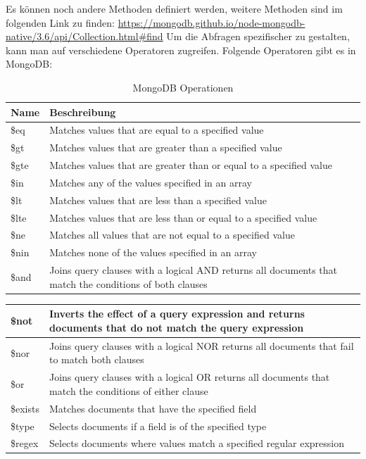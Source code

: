 \cite{mongodb_query_methods}
\newline
Es können noch andere Methoden definiert werden, weitere Methoden sind im folgenden Link zu finden:
\newline
\url{https://mongodb.github.io/node-mongodb-native/3.6/api/Collection.html#find}
\newline
Um die Abfragen spezifischer zu gestalten, kann man auf verschiedene Operatoren zugreifen. Folgende Operatoren gibt es in MongoDB:
\begin{table}[h]
\caption{MongoDB Operationen}
\label{demo-table}
    \begin{tabular}{ | m{1.5cm} | m{13cm} | } 
        \hline
        Name & Beschreibung \\ [0.5ex] 
        \hline\hline
        \$eq & Matches values that are equal to a specified value \\
        \hline
        \$gt & Matches values that are greater than a specified value \\
        \hline
        \$gte & Matches values that are greater than or equal to a specified value \\
        \hline
        \$in & Matches any of the values specified in an array \\
        \hline
        \$lt & Matches values that are less than a specified value \\
        \hline
        \$lte & Matches values that are less than or equal to a specified value \\
        \hline
        \$ne & Matches all values that are not equal to a specified value \\
        \hline
        \$nin & Matches none of the values specified in an array \\
        \hline
        \$and & Joins query clauses with a logical AND returns all documents that match the conditions of both clauses \\
    \end{tabular}
\end{table}
\begin{center}
    \begin{tabular}{ | m{1.5cm} | m{13cm} | }
        \$not & Inverts the effect of a query expression and returns documents that do not match the query expression \\
        \hline
        \$nor & Joins query clauses with a logical NOR returns all documents that fail to match both clauses \\
        \hline
        \$or & Joins query clauses with a logical OR returns all documents that match the conditions of either clause \\
        \$exists & Matches documents that have the specified field \\
        \hline
        \$type & Selects documents if a field is of the specified type \\
        \hline
        \$regex & Selects documents where values match a specified regular expression \\
        \hline
    \end{tabular}
\end{center}
